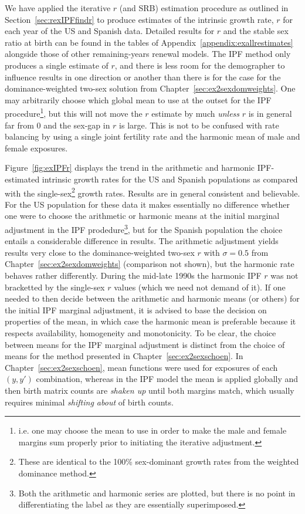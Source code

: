 \FloatBarrier

We have applied the iterative $r$ (and SRB) estimation procedure as outlined in
Section~\ref{sec:rexIPFfindr} to produce estimates of the intrinsic growth rate,
$r$ for each year of the US and Spanish data. Detailed results for $r$ and
the stable sex ratio at birth can be found in the tables of
Appendix~\ref{appendix:exallrestimates} alongside those of other remaining-years renewal models. The IPF method only produces a single
estimate of $r$, and there is less room for the demographer to influence results in one direction or another than there is for the case for the dominance-weighted two-sex solution from Chapter~\ref{sec:ex2sexdomweights}. One may
arbitrarily choose which global mean to use at the outset for the IPF
procedure\footnote{i.e. one may choose the mean to use in order to make the male
and female margins sum properly prior to initiating the iterative adjustment.},
but this will not move the $r$ estimate by much \textit{unless} $r$ is in
general far from 0 and the sex-gap in $r$ is large. This is not to be confused
with rate balancing by using a single joint fertility rate and the harmonic 
mean of male and female exposures.

Figure~\ref{fig:exIPFr} displays the trend in the arithmetic and harmonic
IPF-estimated intrinsic growth rates for the US and Spanish populations as
compared with the single-sex\footnote{These are identical to the
100\% sex-dominant growth rates from the weighted dominance method.} growth
rates. Results are in general consistent and believable. For the US population 
for these data it makes essentially no difference whether one were to choose the
 arithmetic or harmonic means at the initial marginal adjustment in the IPF 
 prodedure\footnote{Both the arithmetic
and harmonic series are plotted, but there is no point in differentiating the
label as they are essentially superimposed.}, but for the Spanish population the
choice entails a considerable difference in results. The arithmetic
adjustment yields results very close to the dominance-weighted two-sex $r$ with
$\sigma = 0.5$ from Chapter~\ref{sec:ex2sexdomweights} (comparison not shown),
but the harmonic rate behaves rather differently. During the mid-late 1990s the
harmonic IPF $r$ was not bracketted by the single-sex $r$ values (which we
need not demand of it). If one needed to then decide between the arithmetic and
harmonic means (or others) for the initial IPF marginal adjustment, it is
advised to base the decision on properties of the mean, in which case the
harmonic mean is preferable because it respects availability, homogeneity and
monotonicity. To be clear, the choice between means for the IPF marginal
adjustment is distinct from the choice of means for the method presented in
Chapter~\ref{sec:ex2sexschoen}. In Chapter~\ref{sec:ex2sexschoen}, mean
functions were used for exposures of each $(y,y')$ combination, whereas in the
IPF model the mean is applied globally and then birth matrix counts are \textit{shaken up}
until both margins match, which usually requires minimal \textit{shifting about}
of birth counts.

